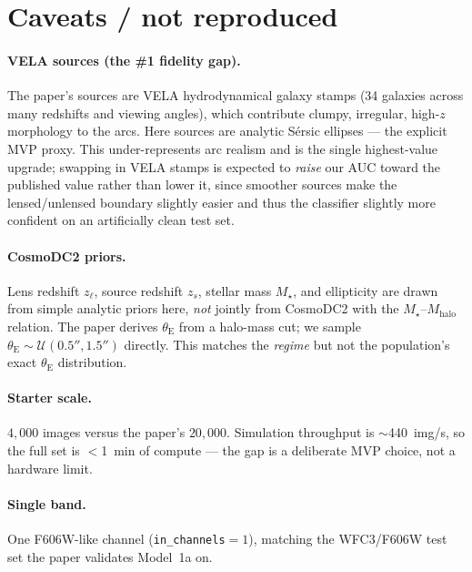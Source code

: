 \documentclass[11pt,letterpaper]{article}
\newcommand{\thetaE}{\ensuremath{\theta_{\mathrm{E}}}}
\newcommand{\Mhalo}{\ensuremath{M_{\mathrm{halo}}}}
\newcommand{\Mstar}{\ensuremath{M_\star}}
\begin{document}
\section{Caveats / not reproduced}
\label{sec:caveats}

\paragraph{VELA sources (the \#1 fidelity gap).} The paper's sources are
VELA hydrodynamical galaxy stamps
\autocite{snyder2018vela,simons2019vela} (34 galaxies across many
redshifts and viewing angles), which contribute clumpy, irregular,
high-$z$ morphology to the arcs. Here sources are analytic S\'ersic
ellipses --- the explicit MVP proxy. This under-represents arc realism
and is the single highest-value upgrade; swapping in VELA stamps is
expected to \emph{raise} our AUC toward the published value rather than
lower it, since smoother sources make the lensed/unlensed boundary
slightly easier and thus the classifier slightly more confident on an
artificially clean test set.

\paragraph{CosmoDC2 priors.} Lens redshift $z_\ell$, source redshift
$z_s$, stellar mass $\Mstar$, and ellipticity are drawn from simple
analytic priors here, \emph{not} jointly from CosmoDC2
\autocite{korytov2019cosmodc2} with the \citet{shuntov2022cosmos}
$\Mstar$--$\Mhalo$ relation. The paper derives $\thetaE$ from a halo-mass
cut; we sample $\thetaE \sim \mathcal{U}(0.5'',1.5'')$ directly. This
matches the \emph{regime} but not the population's exact $\thetaE$
distribution.

\paragraph{Starter scale.} $4{,}000$ images versus the paper's
$20{,}000$. Simulation throughput is $\sim$440~img/s, so the full set is
$<$1~min of compute --- the gap is a deliberate MVP choice, not a
hardware limit.

\paragraph{Single band.} One F606W-like channel
(\texttt{in\_channels}$=1$), matching the WFC3/F606W test set the paper
validates Model~1a on.
\end{document}
